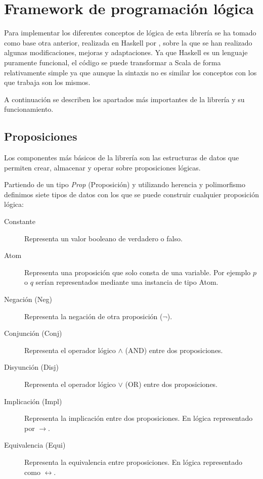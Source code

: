 \section*{Framework de programación lógica}

	Para implementar los diferentes conceptos de lógica de esta librería se ha tomado como base otra anterior, realizada en Haskell por , sobre la que se han realizado algunas modificaciones, mejoras y adaptaciones. Ya que Haskell es un lenguaje puramente funcional, el código se puede transformar a Scala de forma relativamente simple ya que aunque la sintaxis no es similar los conceptos con los que trabaja son los mismos.
	
	A continuación se describen los apartados más importantes de la librería y su funcionamiento.
	

\subsection*{Proposiciones}

	Los componentes más básicos de la librería son las estructuras de datos que permiten crear, almacenar y operar sobre proposiciones lógicas.
	
	Partiendo de un tipo \textit{Prop} (Proposición) y utilizando herencia y polimorfismo definimos siete tipos de datos con los que se puede construir cualquier proposición lógica:
	
	\begin{description}
		\item[Constante] Representa un valor booleano de verdadero o falso.
		\item[Atom] Representa una proposición que solo consta de una variable. Por ejemplo $p$ o $q$ serían representados mediante una instancia de tipo Atom.
		\item[Negación (Neg)] Representa la negación de otra proposición ($\neg$).
		\item[Conjunción (Conj)] Representa el operador lógico $\wedge$ (AND) entre dos proposiciones.
		\item[Disyunción (Disj)] Representa el operador lógico $\vee$ (OR) entre dos proposiciones.
		\item[Implicación (Impl)] Representa la implicación entre dos proposiciones. En lógica representado por $\rightarrow$.
		\item[Equivalencia (Equi)] Representa la equivalencia entre proposiciones. En lógica representado como $\leftrightarrow$.
	\end{description}

